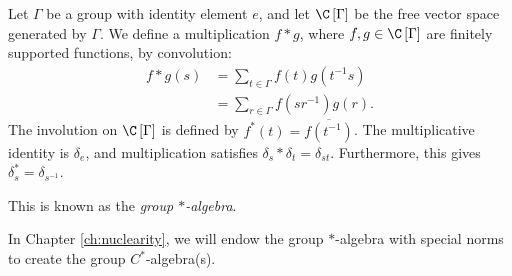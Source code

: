 \begin{definition}\label{def:group_star_algebra}
  Let $\Gamma$ be a group with identity element $e$, and let $\C\left[\Gamma\right]$ be the free vector space generated by $\Gamma$. We define a multiplication $f \ast g$, where $f,g\in \C\left[\Gamma\right]$ are finitely supported functions, by convolution:
  \begin{align*}
    f\ast g(s) &= \sum_{t\in\Gamma}f(t)g\left(t^{-1}s\right)\\
               &= \sum_{r\in\Gamma}f\left(sr^{-1}\right)g\left(r\right).
  \end{align*}
  The involution on $\C\left[\Gamma\right]$ is defined by $f^{\ast}\left(t\right) = \overline{f\left(t^{-1}\right)}$. The multiplicative identity is $\delta_e$, and multiplication satisfies $\delta_s\ast \delta_t = \delta_{st}$. Furthermore, this gives $\delta_{s}^{\ast} = \delta_{s^{-1}}$.\newline

  This is known as the \textit{group $\ast$-algebra}.
\end{definition}
\begin{remark}
  In Chapter \ref{ch:nuclearity}, we will endow the group $\ast$-algebra with special norms to create the group $C^{\ast}$-algebra(s).
\end{remark}

